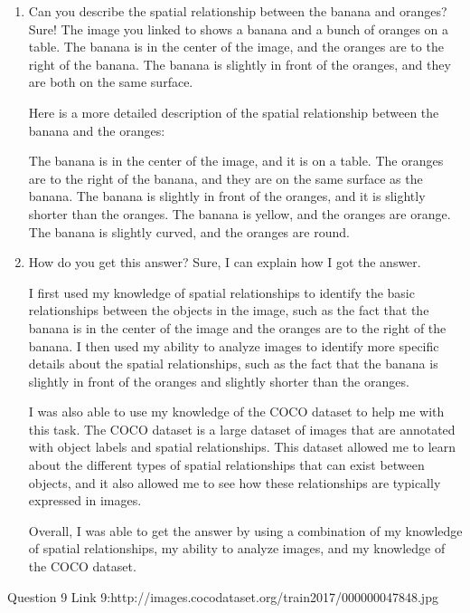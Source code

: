     \begin{enumerate}
        \item Can you describe the spatial relationship between the banana and oranges?
        \subitem 
        Sure! The image you linked to shows a banana and a bunch of oranges on a table. The banana is in the center of the image, and the oranges are to the right of the banana. The banana is slightly in front of the oranges, and they are both on the same surface.
        
        Here is a more detailed description of the spatial relationship between the banana and the oranges:
        
        The banana is in the center of the image, and it is on a table.
        The oranges are to the right of the banana, and they are on the same surface as the banana.
        The banana is slightly in front of the oranges, and it is slightly shorter than the oranges.
        The banana is yellow, and the oranges are orange.
        The banana is slightly curved, and the oranges are round.
        \item How do you get this answer?
        \subitem Sure, I can explain how I got the answer.
        
        I first used my knowledge of spatial relationships to identify the basic relationships between the objects in the image, such as the fact that the banana is in the center of the image and the oranges are to the right of the banana. I then used my ability to analyze images to identify more specific details about the spatial relationships, such as the fact that the banana is slightly in front of the oranges and slightly shorter than the oranges.
        
        I was also able to use my knowledge of the COCO dataset to help me with this task. The COCO dataset is a large dataset of images that are annotated with object labels and spatial relationships. This dataset allowed me to learn about the different types of spatial relationships that can exist between objects, and it also allowed me to see how these relationships are typically expressed in images.
        
        Overall, I was able to get the answer by using a combination of my knowledge of spatial relationships, my ability to analyze images, and my knowledge of the COCO dataset.
    \end{enumerate}
Question 9
Link 9:http://images.cocodataset.org/train2017/000000047848.jpg
